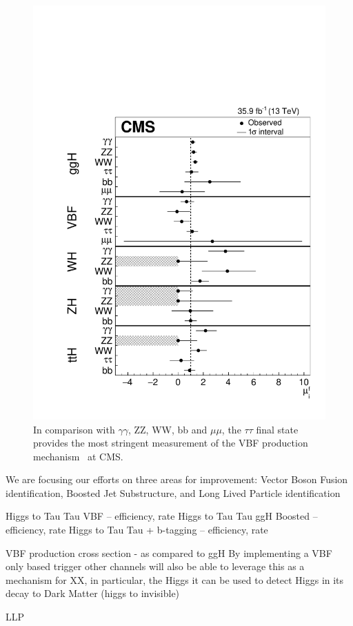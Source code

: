 \documentclass[preprint,12pt]{elsarticle}
\begin{document}
\begin{figure}[h]
\centering\includegraphics[width=0.4\linewidth]{CMS-HIG-17-031_Figure_006_VBF_Comparison.pdf}
\caption{In comparison with $\gamma\gamma$, ZZ, WW, bb and $\mu\mu$, the $\tau\tau$ final state provides the most stringent measurement of the VBF production mechanism~\cite{Sirunyan:2018koj} at CMS.}
\label{fig:Sirunyan2018koj}
\end{figure}

We are focusing our efforts on three areas for improvement: Vector Boson Fusion  identification, Boosted Jet Substructure, and Long Lived Particle identification

Higgs to Tau Tau VBF – efficiency, rate
Higgs to Tau Tau ggH Boosted – efficiency, rate
Higgs to Tau Tau + b-tagging – efficiency, rate


VBF production cross section - as compared to ggH
By implementing a VBF only based trigger other channels will also be able
to leverage this as a mechanism for XX, in particular, the Higgs it can be
used to detect Higgs in its decay to Dark Matter (higgs to invisible)

LLP


\newpage


\end{document}
